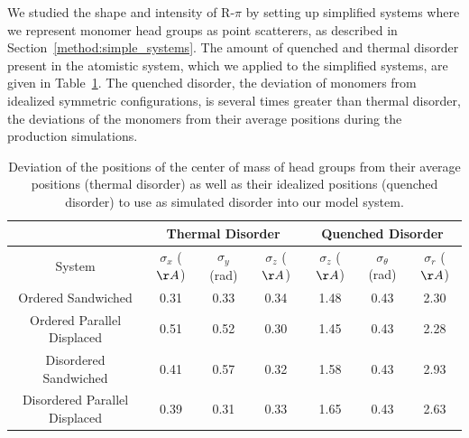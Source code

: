 \documentclass[journal=jpcbfk,manuscript=article]{achemso}
\begin{document}
  We studied the shape and intensity of R-$\pi$ by setting up simplified
  systems where we represent monomer head groups as point scatterers, as
  described in Section~\ref{method:simple_systems}. The amount of quenched and
  thermal disorder present in the atomistic system, which we applied to the
  simplified systems, are given in Table~\ref{table:quenched_disorder}. The
  quenched disorder, the deviation of monomers from idealized symmetric
  configurations, is several times greater than thermal disorder, the 
  deviations of the monomers from their average positions during the 
  production simulations. 
  
  \begin{table}[h]
  \centering
  \begin{tabular}{c|ccc|ccc}
  \toprule
   		                        &           \multicolumn{3}{c}{Thermal Disorder}             &             \multicolumn{3}{c}{Quenched Disorder}               \\
  \midrule
  System                        & $\sigma_x$ ($\AA$) & $\sigma_y$ (rad) & $\sigma_z$ ($\AA$) & $\sigma_z$ ($\AA$) & $\sigma_\theta$ (rad) & $\sigma_r$ ($\AA$) \\
  \midrule
  Ordered Sandwiched            &         0.31       &       0.33       &        0.34        &        1.48        &     0.43              &     2.30           \\
  Ordered Parallel Displaced    &         0.51       &       0.52       &        0.30        &        1.45        &     0.43              &     2.28           \\ 
  Disordered Sandwiched         &         0.41       &       0.57       &        0.32        &        1.58        &     0.43              &     2.93           \\
  Disordered Parallel Displaced &         0.39       &       0.31       &        0.33        &        1.65        &     0.43              &     2.63           \\
  \bottomrule
  \end{tabular}
  \caption{Deviation of the positions of the center of mass of head groups from their average
  positions (thermal disorder) as well as their idealized positions (quenched disorder) to use 
  as simulated disorder into our model system.}
  \label{table:quenched_disorder} 
  \end{table}
\end{document}
